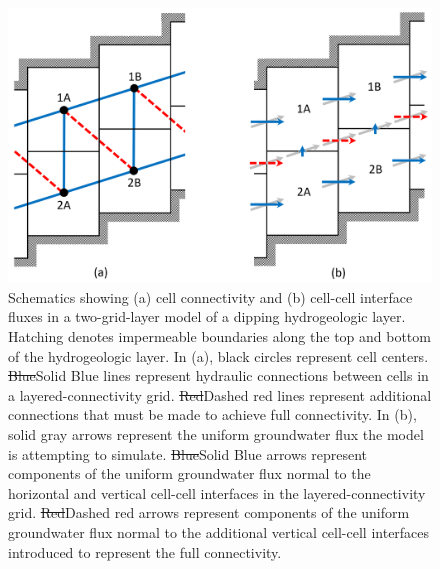 \documentclass{article}
\begin{document}
\begin{figure}
	\begin{center}
	\includegraphics[scale=1.0]{../figures/fig1_paper.png}
	\caption{Schematics showing (a) cell connectivity and (b) cell-cell interface fluxes in a two-grid-layer model of a dipping hydrogeologic layer. Hatching denotes impermeable boundaries along the top and bottom of the hydrogeologic layer. In (a), black circles represent cell centers. {\color{red} \sout{Blue}Solid Blue} lines represent hydraulic connections between cells in a layered-connectivity grid. {\color{red} \sout{Red}Dashed red} lines represent additional connections that must be made to achieve full connectivity. In (b), {\color{red}solid} gray arrows represent the uniform groundwater flux the model is attempting to simulate. {\color{red} \sout{Blue}Solid Blue} arrows represent components of the uniform groundwater flux normal to the horizontal and vertical cell-cell interfaces in the layered-connectivity grid. {\color{red} \sout{Red}Dashed red} arrows represent components of the uniform groundwater flux normal to the additional vertical cell-cell interfaces introduced to represent the full connectivity.}
	\label{fig:schem-conn-area-flux}
	\end{center}
\end{figure}
\end{document}
